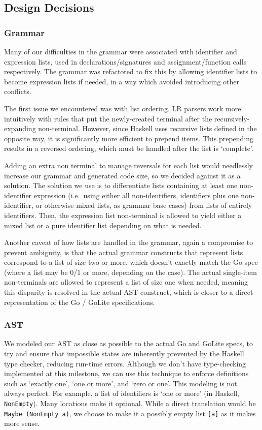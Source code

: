 \documentclass[11pt]{article}
\begin{document}
\subsection{Design Decisions}
\subsubsection{Grammar}
Many of our difficulties in the grammar were associated with
identifier and expression lists, used in declarations/signatures and
assignment/function calls respectively. The grammar was refactored to
fix this by allowing identifier lists to become expression lists if
needed, in a way which avoided introducing other conflicts.

The first issue we encountered was with list ordering. LR parsers work
more intuitively with rules that put the newly-created terminal after
the recursively-expanding non-terminal. However, since Haskell uses
recursive lists defined in the opposite way, it is significantly more
efficient to prepend items. This prepending results in a reversed
ordering, which must be handled after the list is `complete'.

Adding an extra non terminal to manage reversals for each list would
needlessly increase our grammar and generated code size, so we decided
against it as a solution. The solution we use is to differentiate
lists containing at least one non-identifier expression (i.e.\ using
either all non-identifiers, identifiers plus one non-identifier, or
otherwise mixed lists, as grammar base cases) from lists of entirely
identifiers. Then, the expression list non-terminal is allowed to
yield either a mixed list or a pure identifier list depending on what
is needed.

Another caveat of how lists are handled in the grammar, again a
compromise to prevent ambiguity, is that the actual grammar constructs
that represent lists correspond to a list of size two or more, which
doesn't exactly match the Go spec (where a list may be 0/1 or more,
depending on the case). The actual single-item non-terminals are
allowed to represent a list of size one when needed, meaning this
disparity is resolved in the actual AST construct, which is closer to
a direct representation of the Go / GoLite specifications.
\subsubsection{AST}
We modeled our AST as close as possible to the actual Go and GoLite
specs, to try and ensure that impossible states are inherently
prevented by the Haskell type checker, reducing run-time errors.
Although we don't have type-checking implemented at this milestone, we
can use this technique to enforce definitions such as `exactly one',
`one or more', and `zero or one'. This modeling is not always
perfect. For example, a list of identifiers\cite{gospec:idlist} is
`one or more' (in Haskell, \texttt{NonEmpty}). Many locations make it
optional. While a direct translation would be \texttt{Maybe (NonEmpty
  a)}, we choose to make it a possibly empty list \texttt{[a]} as it
makes more sense.
\end{document}
